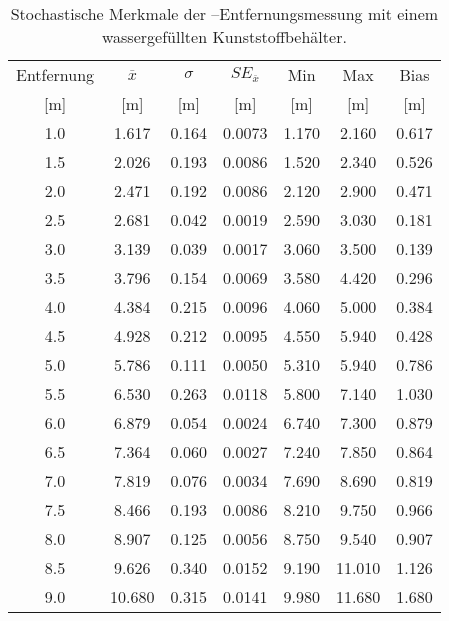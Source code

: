 \begin{appendices}
\begin{table}[h]
	\centering
	\begin{tabular}{||c||ccc||cc||c||}
\hline
Entfernung & $\overline{x}$ & $\sigma$ & $SE_{\overline{x}}$ & Min & Max & Bias \\
{[}\si{\meter}{]} & {[}\si{\meter}{]} & {[}\si{\meter}{]} & {[}\si{\meter}{]} & {[}\si{\meter}{]} & {[}\si{\meter}{]} & {[}\si{\meter}{]} \\
\hline
\hline
\num{1.0} & \num{1.617} & \num{0.164} & \num{0.0073} & \num{1.170} & \num{2.160} & \num{0.617} \\
\num{1.5} & \num{2.026} & \num{0.193} & \num{0.0086} & \num{1.520} & \num{2.340} & \num{0.526} \\
\num{2.0} & \num{2.471} & \num{0.192} & \num{0.0086} & \num{2.120} & \num{2.900} & \num{0.471} \\
\num{2.5} & \num{2.681} & \num{0.042} & \num{0.0019} & \num{2.590} & \num{3.030} & \num{0.181} \\
\num{3.0} & \num{3.139} & \num{0.039} & \num{0.0017} & \num{3.060} & \num{3.500} & \num{0.139} \\
\num{3.5} & \num{3.796} & \num{0.154} & \num{0.0069} & \num{3.580} & \num{4.420} & \num{0.296} \\
\num{4.0} & \num{4.384} & \num{0.215} & \num{0.0096} & \num{4.060} & \num{5.000} & \num{0.384} \\
\num{4.5} & \num{4.928} & \num{0.212} & \num{0.0095} & \num{4.550} & \num{5.940} & \num{0.428} \\
\num{5.0} & \num{5.786} & \num{0.111} & \num{0.0050} & \num{5.310} & \num{5.940} & \num{0.786} \\
\num{5.5} & \num{6.530} & \num{0.263} & \num{0.0118} & \num{5.800} & \num{7.140} & \num{1.030} \\
\num{6.0} & \num{6.879} & \num{0.054} & \num{0.0024} & \num{6.740} & \num{7.300} & \num{0.879} \\
\num{6.5} & \num{7.364} & \num{0.060} & \num{0.0027} & \num{7.240} & \num{7.850} & \num{0.864} \\
\num{7.0} & \num{7.819} & \num{0.076} & \num{0.0034} & \num{7.690} & \num{8.690} & \num{0.819} \\
\num{7.5} & \num{8.466} & \num{0.193} & \num{0.0086} & \num{8.210} & \num{9.750} & \num{0.966} \\
\num{8.0} & \num{8.907} & \num{0.125} & \num{0.0056} & \num{8.750} & \num{9.540} & \num{0.907} \\
\num{8.5} & \num{9.626} & \num{0.340} & \num{0.0152} & \num{9.190} & \num{11.010} & \num{1.126} \\
\num{9.0} & \num{10.680} & \num{0.315} & \num{0.0141} & \num{9.980} & \num{11.680} & \num{1.680} \\
\hline
	\end{tabular}
	\caption{Stochastische Merkmale der --Entfernungsmessung mit einem wassergefüllten Kunststoffbehälter.}
	\label{tab:entfernungsmessung_2018_01_20_nlos_water}
\end{table}


\end{appendices}
